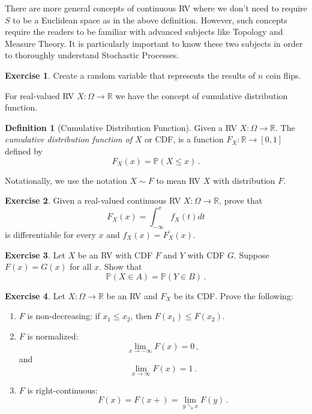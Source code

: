 \documentclass[
  openany]{book}
\theoremstyle{definition}
\newtheorem{definition}{Definition}[chapter]
\theoremstyle{definition}
\theoremstyle{definition}
\newtheorem{exercise}{Exercise}[chapter]
\theoremstyle{definition}
\theoremstyle{remark}
\begin{document}
There are more general concepts of continuous RV where we don't need to require
\(S\) to be a Euclidean space as in the above definition.
However, such concepts require the readers to be familiar with advanced subjects
like Topology and Measure Theory. It is particularly important to know these two
subjects
in order to thoroughly understand Stochastic Processes.

\begin{exercise}
Create a random variable that represents the results of \(n\) coin flips.
\end{exercise}

For real-valued RV \(X:\Omega \to \mathbb{R}\) we have the concept of cumulative distribution function.

\begin{definition}[Cumulative Distribution Function]
Given a RV \(X:\Omega \to \mathbb{R}\).
The \emph{cumulative distribution function of \(X\)} or CDF, is
a function \(F_X : \mathbb{R}\to [0,1]\)
defined by
\[ F_X (x) = \mathbb{P}(X \leq x) \,. \]
\end{definition}

Notationally, we use the notation \(X\sim F\) to mean
RV \(X\) with distribution \(F\).

\begin{exercise}
Given a real-valued continuous RV \(X: \Omega \to \mathbb{R}\), prove that
\[
F_X(x)=\int_{-\infty}^x f_X(t) d t
\]
is differentiable for every \(x\)
and \(f_X(x)=F_X^{\prime}(x)\).
\end{exercise}

\begin{exercise}
Let \(X\) be an RV with CDF \(F\) and \(Y\) with CDF \(G\).
Suppose \(F(x) = G(x)\) for all \(x\). Show that
\[ \mathbb{P}(X \in A) = \mathbb{P}(Y \in B) \,.\]
\end{exercise}

\begin{exercise}

Let \(X:\Omega \to \mathbb{R}\) be an RV and \(F_X\) be its CDF.
Prove the following:

\begin{enumerate}
\def\labelenumi{\arabic{enumi}.}
\item
  \(F\) is non-decreasing: if \(x_1 \leq x_2\), then \(F(x_1) \leq F(x_2)\).
\item
  \(F\) is normalized:
  \[ \lim_{x\to -\infty} F(x) = 0 \,,\]
  and
  \[ \lim_{x\to \infty} F(x) = 1 \,.\]
\item
  \(F\) is right-continuous:
  \[ F(x) = F(x+) = \lim_{y \searrow x} F(y) \,.\]
\end{enumerate}

\end{exercise}
\end{document}
